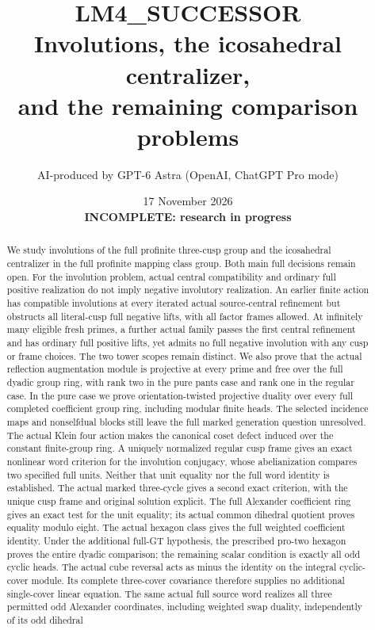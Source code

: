 \documentclass[11pt,a4paper]{article}
\title{LM4\_SUCCESSOR\\Involutions, the icosahedral centralizer,\\and the remaining comparison problems}
\author{AI-produced by GPT-6 Astra (OpenAI, ChatGPT Pro mode)}
\date{17 November 2026\\\textbf{INCOMPLETE: research in progress}}
\begin{document}
\maketitle
\begin{abstract}
We study involutions of the full profinite three-cusp group and
the icosahedral centralizer in the full profinite mapping class group.
Both main full decisions remain open.
For the involution problem, actual central compatibility and ordinary
full positive realization do not imply negative involutory realization.
An earlier finite action has compatible involutions at every iterated
actual source-central refinement but obstructs all literal-cusp full
negative lifts, with all factor frames allowed. At infinitely many
eligible fresh primes, a further actual family passes the first central
refinement and has ordinary full positive lifts, yet admits no full
negative involution with any cusp or frame choices. The two tower scopes
remain distinct. We also prove that the actual reflection augmentation
module is projective at every prime and free over the full dyadic group
ring, with rank two in the pure pants case and rank one in the regular
case. In the pure case we prove orientation-twisted projective duality
over every full completed coefficient group ring, including modular
finite heads. The selected incidence maps and nonselfdual blocks still
leave the full marked generation question unresolved. The actual
Klein four action makes the canonical coset defect induced over the
constant finite-group ring. A uniquely normalized regular cusp frame
gives an exact nonlinear word criterion for the involution conjugacy,
whose abelianization compares two specified full units. Neither that
unit equality nor the full word identity is established. The actual
marked three-cycle gives a second exact criterion, with the unique cusp
frame and original solution explicit. The full Alexander coefficient
ring gives an exact test for the unit equality; its actual common
dihedral quotient proves equality modulo eight. The actual hexagon class gives
the full weighted coefficient identity. Under the additional full-GT
hypothesis, the prescribed pro-two hexagon proves the entire dyadic
comparison; the remaining scalar condition is exactly all odd cyclic
heads. The actual cube reversal acts as minus the identity on the
integral cyclic-cover module. Its complete three-cover covariance
therefore supplies no additional single-cover linear equation. The same actual full
source word realizes all three permitted odd Alexander coordinates,
including weighted swap duality, independently of its odd dihedral

\end{abstract}
\end{document}
